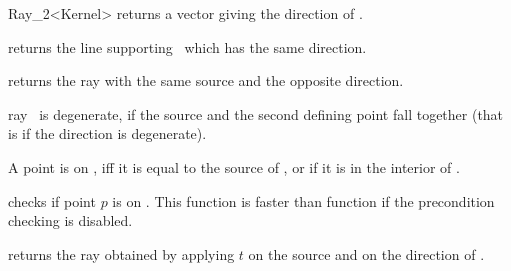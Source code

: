 \begin{ccRefClass}{Ray_2<Kernel>}
       {returns a vector giving the direction of \ccVar.}

       {returns the line supporting \ccVar\ which has the same direction.}

       {returns the ray with the same source and the opposite direction.}

\ccPredicates

       {ray \ccVar\ is degenerate, if the source and the second defining
        point fall together (that is if the direction is degenerate).}

       {}
\ccGlue
{}
       {}

       {A point is on \ccVar, iff it is equal to the source
        of \ccVar, or if it is in the interior of \ccVar.}

       {checks if point $p$ is on \ccVar. This function is faster
        than function  if the precondition 
	checking is disabled.
        }


       {returns the ray obtained by applying $t$ on the source
        and on the direction of \ccVar.}

\ccSeeAlso
{}

\end{ccRefClass} 
